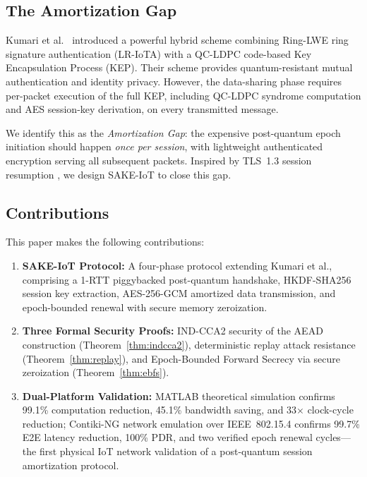 \documentclass[conference]{IEEEtran}
\begin{document}
\subsection{The Amortization Gap}

Kumari et al.~\cite{kumari2022} introduced a powerful hybrid scheme
combining Ring-LWE ring signature authentication (LR-IoTA) with a
QC-LDPC code-based Key Encapsulation Process (KEP). Their scheme
provides quantum-resistant mutual authentication and identity privacy.
However, the data-sharing phase requires per-packet execution of the
full KEP, including QC-LDPC syndrome computation and AES session-key
derivation, on every transmitted message.

We identify this as the \emph{Amortization Gap}: the expensive
post-quantum epoch initiation should happen \emph{once per session},
with lightweight authenticated encryption serving all subsequent
packets. Inspired by TLS~1.3 session resumption \cite{rfc8446}, we
design SAKE-IoT to close this gap.

\subsection{Contributions}

This paper makes the following contributions:

\begin{enumerate}
    \item \textbf{SAKE-IoT Protocol:} A four-phase protocol extending
    Kumari et al., comprising a 1-RTT piggybacked post-quantum
    handshake, HKDF-SHA256 session key extraction, AES-256-GCM
    amortized data transmission, and epoch-bounded renewal with secure
    memory zeroization.

    \item \textbf{Three Formal Security Proofs:} IND-CCA2 security of
    the AEAD construction (Theorem~\ref{thm:indcca2}), deterministic
    replay attack resistance (Theorem~\ref{thm:replay}), and
    Epoch-Bounded Forward Secrecy via secure zeroization
    (Theorem~\ref{thm:ebfs}).

    \item \textbf{Dual-Platform Validation:} MATLAB theoretical
    simulation confirms 99.1\% computation reduction, 45.1\%
    bandwidth saving, and 33$\times$ clock-cycle reduction; Contiki-NG
    network emulation over IEEE~802.15.4 confirms 99.7\% E2E latency
    reduction, 100\% PDR, and two verified epoch renewal cycles---the
    first physical IoT network validation of a post-quantum session
    amortization protocol.
\end{enumerate}
\end{document}
